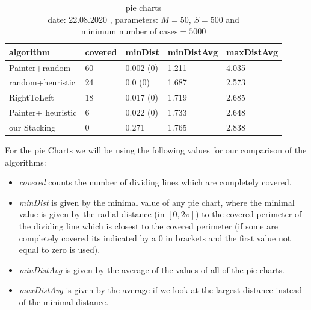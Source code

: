 \documentclass[a4paper,11pt]{article}
\begin{document}
\begin{table}[h]
  \begin{center}
    \begin{tabular}{| l || l | l | l | l |}
      \hline
      algorithm          & covered & minDist   & minDistAvg & maxDistAvg \\
      \hline
      Painter+random     & 60     & 0.002 (0) & 1.211       & 4.035      \\

      random+heuristic   & 24      & 0.0 (0)   & 1.687      & 2.573      \\

      RightToLeft        & 18      & 0.017 (0) & 1.719      & 2.685      \\

      Painter+ heuristic & 6       & 0.022 (0) & 1.733      & 2.648      \\

      our Stacking       & 0       & 0.271     & 1.765      & 2.838      \\

      \hline
    \end{tabular}
  \end{center}
  \caption{pie charts\\
    date: 22.08.2020  , parameters: $M=50$, $S=500$ and $\text{minimum number of cases}=5000$  }

\end{table}
For the pie Charts we will be using the following values for our comparison of the algorithms:
\begin{itemize}
  \item \textit{covered} counts the number of dividing lines which are completely covered.
  \item \textit{minDist} is given by the minimal value of any pie chart, where the minimal value is given by the radial distance (in $[0,2\pi]$) to the covered perimeter of the dividing line which is closest to the covered perimeter (if some are completely covered its indicated by a 0 in brackets and the first value not equal to zero is used).
  \item \textit{minDistAvg} is given by the average of the values of all of the pie charts.
  \item \textit{maxDistAvg} is given by the average if we look at the largest distance instead of the minimal distance.
\end{itemize}
\end{document}
